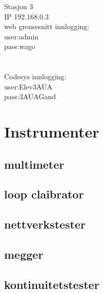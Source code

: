 Stasjon 3 \\
IP 192.168.0.3\\
web grensesnitt innlogging:\\
user:admin\\
pass:wago\\
\\\\
Codesys innlogging:\\
user:Elev3AUA\\
pass:3AUAGand\\
\section{Instrumenter}
\subsection{multimeter}
\subsection{loop claibrator}
\subsection{nettverkstester}
\subsection{megger}
\subsection{kontinuitetstester}





